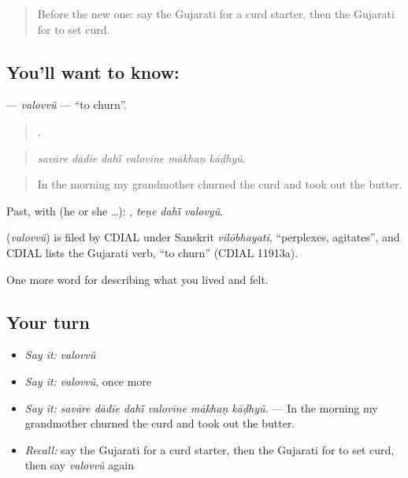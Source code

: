 \label{lesson:GU-C521-valovvu}



\begin{quote}
Before the new one: say the Gujarati for a curd starter, then the Gujarati for to set curd.
\end{quote}

\subsection*{You'll want to know: }
\textbf{} — \emph{valovvũ} — \textquotedblleft{}to churn\textquotedblright{}.

\begin{quote}
     .
\end{quote}

\begin{quote}
\emph{savāre dādīe dahī̃ valovīne mākhaṇ kāḍhyũ.}
\end{quote}

\begin{quote}
In the morning my grandmother churned the curd and took out the butter.
\end{quote}

Past, with  (he or she …):   , \emph{teṇe dahī̃ valovyũ}.

\begin{cousinweb}
\textbf{} (\emph{valovvũ}) is filed by CDIAL under Sanskrit \emph{vilōbhayati}, \textquotedblleft{}perplexes, agitates\textquotedblright{}, and CDIAL lists the Gujarati verb, \textquotedblleft{}to churn\textquotedblright{} (CDIAL 11913a).
\end{cousinweb}

\begin{grammarlens}[title={What you've built}]
One more word for describing what you lived and felt.
\end{grammarlens}

\subsection*{Your turn}
\begin{itemize}
\raggedright
  \item \emph{Say it:} \emph{valovvũ}
  \item \emph{Say it:} \emph{valovvũ}, once more
  \item \emph{Say it:} \emph{savāre dādīe dahī̃ valovīne mākhaṇ kāḍhyũ.} — In the morning my grandmother churned the curd and took out the butter.
  \item \emph{Recall:} say the Gujarati for a curd starter, then the Gujarati for to set curd, then say \emph{valovvũ} again
\end{itemize}

